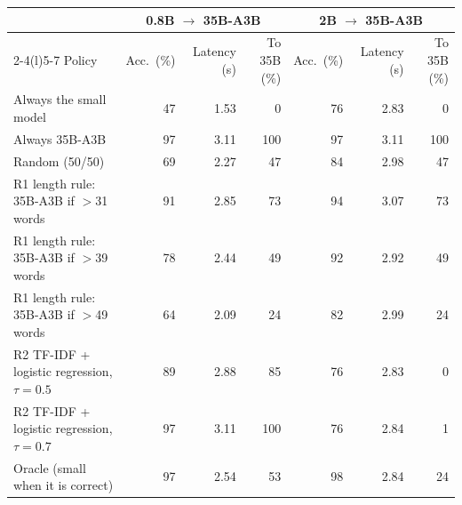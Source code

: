\begin{tabular}{@{}lrrrrrr@{}}
\toprule
 & \multicolumn{3}{c}{0.8B $\rightarrow$ 35B-A3B} & \multicolumn{3}{c}{2B $\rightarrow$ 35B-A3B} \\
\cmidrule(lr){2-4}\cmidrule(l){5-7}
Policy & Acc.\ (\%) & Latency (s) & To 35B (\%) & Acc.\ (\%) & Latency (s) & To 35B (\%) \\
\midrule
Always the small model & 47 & 1.53 & 0 & 76 & 2.83 & 0 \\
Always 35B-A3B & 97 & 3.11 & 100 & 97 & 3.11 & 100 \\
Random (50/50) & 69 & 2.27 & 47 & 84 & 2.98 & 47 \\
R1 length rule: 35B-A3B if $>$31 words & 91 & 2.85 & 73 & 94 & 3.07 & 73 \\
R1 length rule: 35B-A3B if $>$39 words & 78 & 2.44 & 49 & 92 & 2.92 & 49 \\
R1 length rule: 35B-A3B if $>$49 words & 64 & 2.09 & 24 & 82 & 2.99 & 24 \\
R2 TF-IDF + logistic regression, $\tau=0.5$ & 89 & 2.88 & 85 & 76 & 2.83 & 0 \\
R2 TF-IDF + logistic regression, $\tau=0.7$ & 97 & 3.11 & 100 & 76 & 2.84 & 1 \\
Oracle (small when it is correct) & 97 & 2.54 & 53 & 98 & 2.84 & 24 \\
\bottomrule
\end{tabular}
